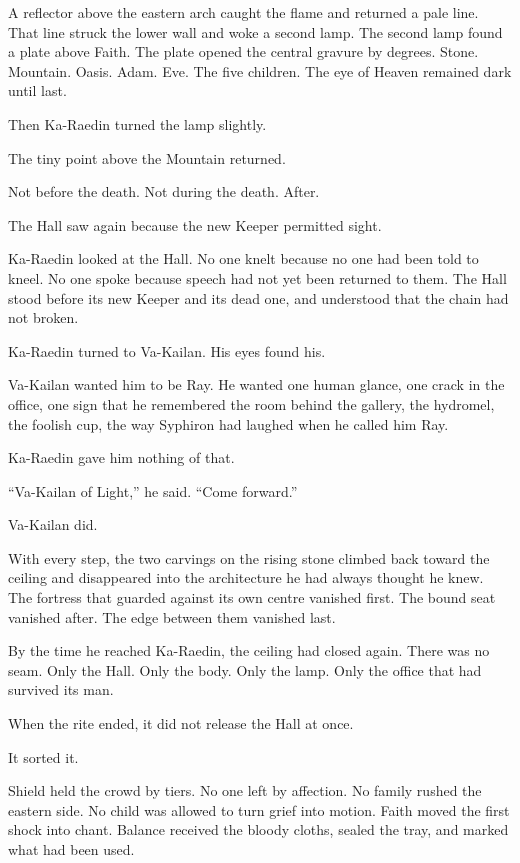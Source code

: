 A reflector above the eastern arch caught the flame and returned a pale line.
That line struck the lower wall and woke a second lamp.
The second lamp found a plate above Faith.
The plate opened the central gravure by degrees.
Stone.
Mountain.
Oasis.
Adam.
Eve.
The five children.
The eye of Heaven remained dark until last.\par
Then Ka-Raedin turned the lamp slightly.\par
The tiny point above the Mountain returned.\par
Not before the death.
Not during the death.
After.\par
The Hall saw again because the new Keeper permitted sight.\par
Ka-Raedin looked at the Hall.
No one knelt because no one had been told to kneel.
No one spoke because speech had not yet been returned to them.
The Hall stood before its new Keeper and its dead one, and understood that the chain had not broken.\par
Ka-Raedin turned to Va-Kailan.
His eyes found his.\par
Va-Kailan wanted him to be Ray.
He wanted one human glance, one crack in the office, one sign that he remembered the room behind the gallery, the hydromel, the foolish cup, the way Syphiron had laughed when he called him Ray.\par
Ka-Raedin gave him nothing of that.\par
“Va-Kailan of Light,” he said.
“Come forward.”\par
Va-Kailan did.\par
With every step, the two carvings on the rising stone climbed back toward the ceiling and disappeared into the architecture he had always thought he knew.
The fortress that guarded against its own centre vanished first.
The bound seat vanished after.
The edge between them vanished last.\par
By the time he reached Ka-Raedin, the ceiling had closed again.
There was no seam.
Only the Hall.
Only the body.
Only the lamp.
Only the office that had survived its man.\par
When the rite ended, it did not release the Hall at once.\par
It sorted it.\par
Shield held the crowd by tiers.
No one left by affection.
No family rushed the eastern side.
No child was allowed to turn grief into motion.
Faith moved the first shock into chant.
Balance received the bloody cloths, sealed the tray, and marked what had been used.
